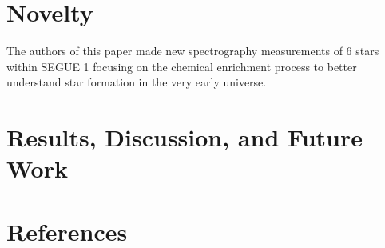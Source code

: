 \section{Novelty}

The authors of this paper made new spectrography measurements of 6 stars within SEGUE 1 focusing on the chemical enrichment process
to better understand star formation in the very early universe. 

\section{Results, Discussion, and Future Work}

\clearpage

\section{References}




